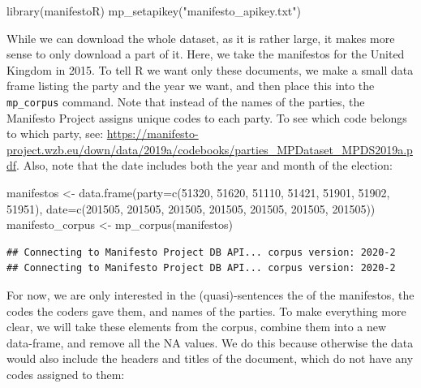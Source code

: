 \documentclass[
]{article}
\newenvironment{Shaded}{\begin{snugshade}}{\end{snugshade}}
\newcommand{\AttributeTok}[1]{\textcolor[rgb]{0.77,0.63,0.00}{#1}}
\newcommand{\DecValTok}[1]{\textcolor[rgb]{0.00,0.00,0.81}{#1}}
\newcommand{\FunctionTok}[1]{\textcolor[rgb]{0.00,0.00,0.00}{#1}}
\newcommand{\NormalTok}[1]{#1}
\newcommand{\OtherTok}[1]{\textcolor[rgb]{0.56,0.35,0.01}{#1}}
\newcommand{\StringTok}[1]{\textcolor[rgb]{0.31,0.60,0.02}{#1}}
\begin{document}
\begin{Shaded}
\begin{Highlighting}[]
\FunctionTok{library}\NormalTok{(manifestoR)}
\FunctionTok{mp\_setapikey}\NormalTok{(}\StringTok{"manifesto\_apikey.txt"}\NormalTok{)}
\end{Highlighting}
\end{Shaded}

While we can download the whole dataset, as it is rather large, it makes more sense to only download a part of it. Here, we take the manifestos for the United Kingdom in 2015. To tell R we want only these documents, we make a small data frame listing the party and the year we want, and then place this into the \texttt{mp\_corpus} command. Note that instead of the names of the parties, the Manifesto Project assigns unique codes to each party. To see which code belongs to which party, see: \url{https://manifesto-project.wzb.eu/down/data/2019a/codebooks/parties_MPDataset_MPDS2019a.pdf}. Also, note that the date includes both the year and month of the election:

\begin{Shaded}
\begin{Highlighting}[]
\NormalTok{manifestos }\OtherTok{\textless{}{-}} \FunctionTok{data.frame}\NormalTok{(}\AttributeTok{party=}\FunctionTok{c}\NormalTok{(}\DecValTok{51320}\NormalTok{, }\DecValTok{51620}\NormalTok{, }\DecValTok{51110}\NormalTok{, }\DecValTok{51421}\NormalTok{, }\DecValTok{51901}\NormalTok{, }\DecValTok{51902}\NormalTok{, }\DecValTok{51951}\NormalTok{), }\AttributeTok{date=}\FunctionTok{c}\NormalTok{(}\DecValTok{201505}\NormalTok{, }\DecValTok{201505}\NormalTok{, }\DecValTok{201505}\NormalTok{, }\DecValTok{201505}\NormalTok{, }\DecValTok{201505}\NormalTok{, }\DecValTok{201505}\NormalTok{, }\DecValTok{201505}\NormalTok{))}
\NormalTok{manifesto\_corpus }\OtherTok{\textless{}{-}} \FunctionTok{mp\_corpus}\NormalTok{(manifestos)}
\end{Highlighting}
\end{Shaded}

\begin{verbatim}
## Connecting to Manifesto Project DB API... corpus version: 2020-2 
## Connecting to Manifesto Project DB API... corpus version: 2020-2
\end{verbatim}

For now, we are only interested in the (quasi)-sentences the of the manifestos, the codes the coders gave them, and names of the parties. To make everything more clear, we will take these elements from the corpus, combine them into a new data-frame, and remove all the NA values. We do this because otherwise the data would also include the headers and titles of the document, which do not have any codes assigned to them:
\end{document}
